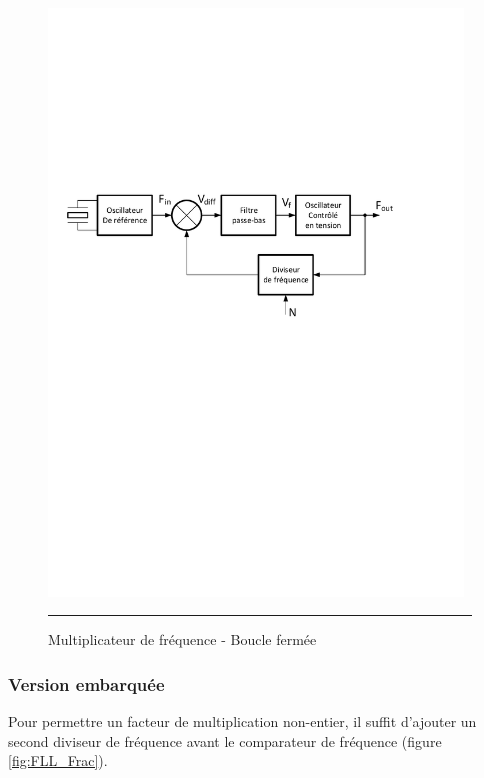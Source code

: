 \begin{figure}[htb]
  \centering
  \includegraphics [angle=0, width=11cm]{./Figures/Chap6_Horloges/FLL_BF.pdf}
  \rule{35em}{0.5pt}
  \caption{Multiplicateur de fréquence - Boucle fermée}
  \label{fig:FLL_BF}
\end{figure}

\subsubsection*{Version embarquée}
Pour permettre un facteur de multiplication non-entier, il suffit d'ajouter un second diviseur de fréquence avant le comparateur de fréquence (figure \ref{fig:FLL_Frac}).

